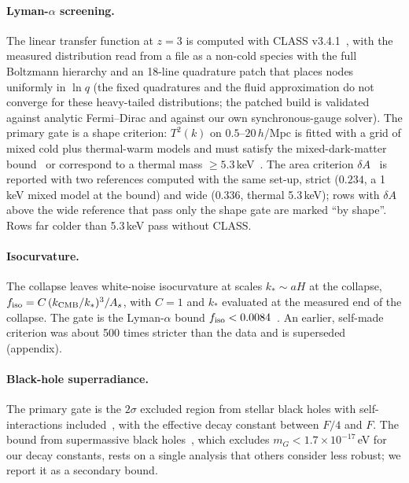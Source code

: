 \documentclass[11pt,a4paper]{article}
\newcommand{\dA}{\delta A}
\begin{document}
\paragraph{Lyman-$\alpha$ screening.}
The linear transfer function at $z=3$ is computed with CLASS v3.4.1~\cite{CLASSII,CLASSIV}, with the measured distribution read from a file as a non-cold species with the full Boltzmann hierarchy and an 18-line quadrature patch that places nodes uniformly in $\ln q$ (the fixed quadratures and the fluid approximation do not converge for these heavy-tailed distributions; the patched build is validated against analytic Fermi--Dirac and against our own synchronous-gauge solver).
The primary gate is a shape criterion: $T^2(k)$ on $0.5$--$20\,h$/Mpc is fitted with a grid of mixed cold plus thermal-warm models and must satisfy the mixed-dark-matter bound~\cite{GarciaGallego2025} or correspond to a thermal mass $\ge5.3$\,keV~\cite{Irsic2017}.
The area criterion $\dA$~\cite{Murgia2017} is reported with two references computed with the same set-up, strict ($0.234$, a 1\,keV mixed model at the bound) and wide ($0.336$, thermal 5.3\,keV); rows with $\dA$ above the wide reference that pass only the shape gate are marked ``by shape''.
Rows far colder than 5.3\,keV pass without CLASS.

\paragraph{Isocurvature.}
The collapse leaves white-noise isocurvature at scales $k_*\sim a H$ at the collapse, $f_{\rm iso}=C\,(k_{\rm CMB}/k_*)^3/A_s$, with $C=1$ and $k_*$ evaluated at the measured end of the collapse.
The gate is the Lyman-$\alpha$ bound $f_{\rm iso}<0.0084$~\cite{GarciaGallego2026}.
An earlier, self-made criterion was about 500 times stricter than the data and is superseded (appendix).

\paragraph{Black-hole superradiance.}
The primary gate is the $2\sigma$ excluded region from stellar black holes with self-interactions included~\cite{WitteMummery2025,BGLS2021}, with the effective decay constant between $F/4$ and $F$.
The bound from supermassive black holes~\cite{Unal2021,ChathirathasSchwetz2025}, which excludes $m_G<1.7\times10^{-17}$\,eV for our decay constants, rests on a single analysis that others consider less robust; we report it as a secondary bound.
\end{document}
